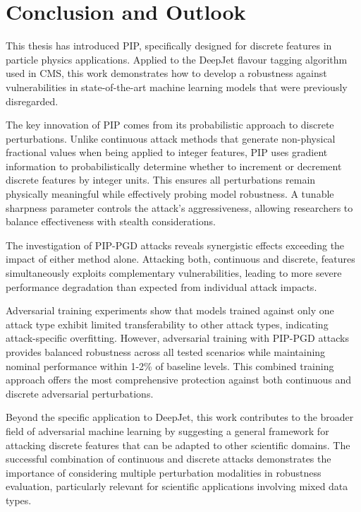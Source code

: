 \chapter{Conclusion and Outlook}

This thesis has introduced PIP, specifically designed for discrete features in particle physics applications. Applied to the DeepJet flavour tagging algorithm used in CMS, this work demonstrates how to develop a robustness against vulnerabilities in state-of-the-art machine learning models that were previously disregarded.

The key innovation of PIP comes from its probabilistic approach to discrete perturbations. Unlike continuous attack methods that generate non-physical fractional values when being applied to integer features, PIP uses gradient information to probabilistically determine whether to increment or decrement discrete features by integer units. This ensures all perturbations remain physically meaningful while effectively probing model robustness. A tunable sharpness parameter controls the attack's aggressiveness, allowing researchers to balance effectiveness with stealth considerations.

The investigation of PIP-PGD attacks reveals synergistic effects exceeding the impact of either method alone. Attacking both, continuous and discrete, features simultaneously exploits complementary vulnerabilities, leading to more severe performance degradation than expected from individual attack impacts.

Adversarial training experiments show that models trained against only one attack type exhibit limited transferability to other attack types, indicating attack-specific overfitting. However, adversarial training with PIP-PGD attacks provides balanced robustness across all tested scenarios while maintaining nominal performance within 1-2\% of baseline levels. This combined training approach offers the most comprehensive protection against both continuous and discrete adversarial perturbations.

Beyond the specific application to DeepJet, this work contributes to the broader field of adversarial machine learning by suggesting a general framework for attacking discrete features that can be adapted to other scientific domains. The successful combination of continuous and discrete attacks demonstrates the importance of considering multiple perturbation modalities in robustness evaluation, particularly relevant for scientific applications involving mixed data types.


